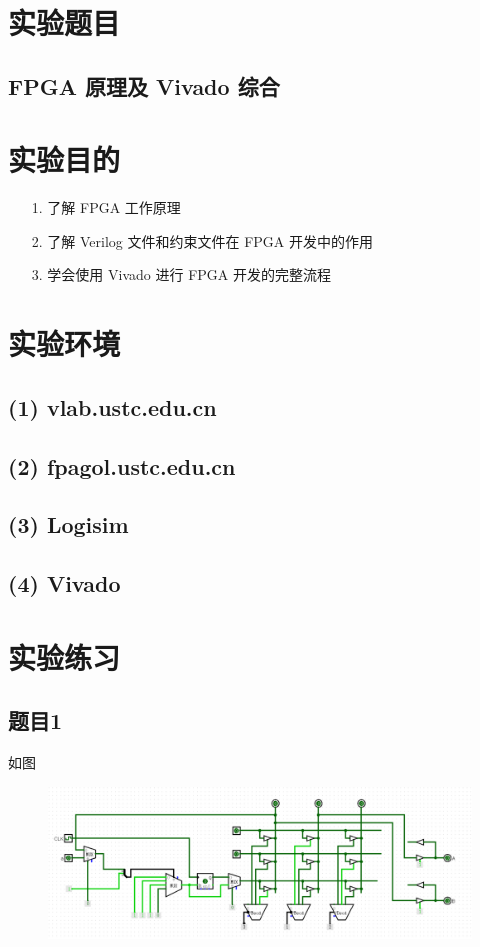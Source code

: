\documentclass{article}
\begin{document}
    \section{实验题目}
        \subsection*{\qquad  FPGA 原理及 Vivado 综合}
     
    \section{实验目的}
        \begin{enumerate}
            \item [1.]了解 FPGA 工作原理
            \item [2.]了解 Verilog 文件和约束文件在 FPGA 开发中的作用
            \item [3.]学会使用 Vivado 进行 FPGA 开发的完整流程
        \end{enumerate}
        
    \section{实验环境}
        \subsection*{\qquad (1) vlab.ustc.edu.cn}
        \subsection*{\qquad (2) fpagol.ustc.edu.cn}
        \subsection*{\qquad (3) Logisim}
        \subsection*{\qquad (4) Vivado}
    
    \vspace*{4cm}
    \section{实验练习}
    \subsection*{题目1} 如图
    \begin{figure}[htbp]
        \centering
        \includegraphics[scale=0.4]{r1.png}
    \end{figure}
    \clearpage
\end{document}
